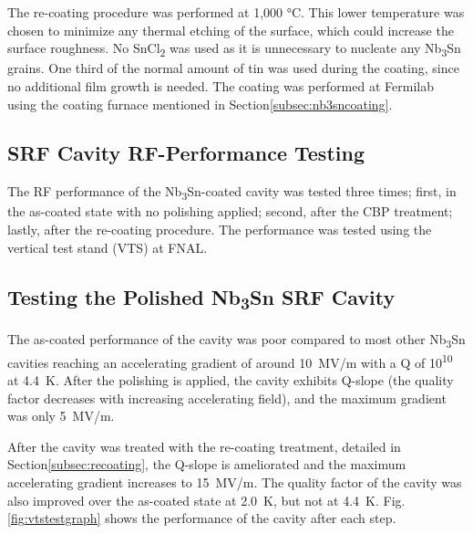 \documentclass[reprint,amsmath,amssymb,aps]{revtex4-2}%
\begin{document}
The re-coating procedure was performed at 1,000 °C. This lower temperature was chosen to minimize any thermal etching of the surface, which could increase the surface roughness. No SnCl\textsubscript{2} was used as it is unnecessary to nucleate any Nb\textsubscript{3}Sn grains. One third of the normal amount of tin was used during the coating, since no additional film growth is needed. The coating was performed at Fermilab using the coating furnace mentioned in Section\ref{subsec:nb3sncoating}.

%
\subsection{SRF Cavity RF-Performance Testing}%
\label{subsec:vts}%
The RF performance of the Nb\textsubscript{3}Sn-coated cavity was tested three times; first, in the as-coated state with no polishing applied; second, after the CBP treatment; lastly, after the re-coating procedure. The performance was tested using the vertical test stand (VTS) at FNAL\cite{pischalnikov2014rf}.

%
\subsection{Testing the Polished Nb\textsubscript{3}Sn SRF Cavity}%
\label{subsec:cavityresults}%
The as-coated performance of the cavity was poor compared to most other Nb\textsubscript{3}Sn cavities reaching an accelerating gradient of around 10~MV/m with a Q of 10\textsuperscript{10} at 4.4~K. After the polishing is applied, the cavity exhibits Q-slope (the quality factor decreases with increasing accelerating field), and the maximum gradient was only 5~MV/m.

After the cavity was treated with the re-coating treatment, detailed in Section\ref{subsec:recoating}, the Q-slope is ameliorated and the maximum accelerating gradient increases to 15~MV/m. The quality factor of the cavity was also improved over the as-coated state at 2.0~K, but not at 4.4~K. Fig.\ref{fig:vtstestgraph} shows the performance of the cavity after each step.
%
\end{document}
